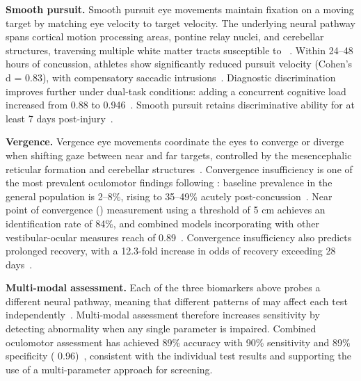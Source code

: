 \textbf{Smooth pursuit.} Smooth pursuit eye movements maintain fixation on a moving target by matching eye velocity to target velocity. The underlying neural pathway spans cortical motion processing areas, pontine relay nuclei, and cerebellar structures, traversing multiple white matter tracts susceptible to ~\cite{mcdonald2022eye, mallott2019cerebellar}. Within 24--48 hours of concussion, athletes show significantly reduced pursuit velocity (Cohen's d = 0.83), with compensatory saccadic intrusions~\cite{murray2019smooth}. Diagnostic discrimination improves further under dual-task conditions: adding a concurrent cognitive load increased  from 0.88 to 0.946~\cite{stubbs2018working}. Smooth pursuit retains discriminative ability for at least 7 days post-injury~\cite{hunfalvay2021smooth}.

\textbf{Vergence.} Vergence eye movements coordinate the eyes to converge or diverge when shifting gaze between near and far targets, controlled by the mesencephalic reticular formation and cerebellar structures~\cite{searle2016vergence}. Convergence insufficiency is one of the most prevalent oculomotor findings following : baseline prevalence in the general population is 2--8\%, rising to 35--49\% acutely post-concussion~\cite{mucha2014voms, pearce2015npc, yaramothu2019vergence, wiecek2021vergence}. Near point of convergence () measurement using a threshold of 5 cm achieves an identification rate of 84\%, and combined models incorporating  with other vestibular-ocular measures reach  of 0.89~\cite{mucha2014voms}. Convergence insufficiency also predicts prolonged recovery, with a 12.3-fold increase in odds of recovery exceeding 28 days~\cite{duprey2017convergence}.

\textbf{Multi-modal assessment.} Each of the three biomarkers above probes a different neural pathway, meaning that different patterns of  may affect each test independently~\cite{mcdonald2022eye}. Multi-modal assessment therefore increases sensitivity by detecting abnormality when any single parameter is impaired. Combined oculomotor assessment has achieved 89\% accuracy with 90\% sensitivity and 89\% specificity ( 0.96)~\cite{kelly2019combined}, consistent with the individual test results and supporting the use of a multi-parameter approach for screening.

